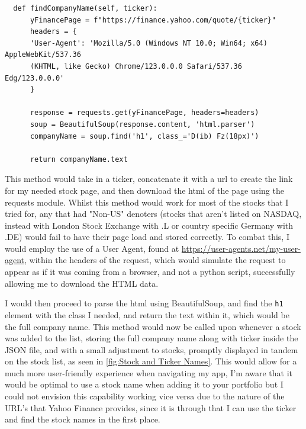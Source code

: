 \documentclass{article}
\begin{document}
\begin{verbatim}
  def findCompanyName(self, ticker):
      yFinancePage = f"https://finance.yahoo.com/quote/{ticker}"
      headers = {
      'User-Agent': 'Mozilla/5.0 (Windows NT 10.0; Win64; x64) AppleWebKit/537.36 
      (KHTML, like Gecko) Chrome/123.0.0.0 Safari/537.36 Edg/123.0.0.0'
      } 

      response = requests.get(yFinancePage, headers=headers)
      soup = BeautifulSoup(response.content, 'html.parser')
      companyName = soup.find('h1', class_='D(ib) Fz(18px)')

      return companyName.text
\end{verbatim}

\vspace{0.3cm}
This method would take in a ticker, concatenate it with a url to create the link for my needed stock page, and then download the html of the page using the requests module. Whilst this method would work for most of the stocks that I tried for, any that had "Non-US" denoters (stocks that aren't listed on NASDAQ, instead with London Stock Exchange with .L or country specific Germany with .DE) would fail to have their page load and stored correctly. To combat this, I would employ the use of a User Agent, found at \url{https://user-agents.net/my-user-agent}, within the headers of the request, which would simulate the request to appear as if it was coming from a browser, and not a python script, successfully allowing me to download the HTML data.\\\vspace{0.3cm}

I would then proceed to parse the html using BeautifulSoup, and find the \texttt{h1} element with the class I needed, and return the text within it, which would be the full company name. This method would now be called upon whenever a stock was added to the list, storing the full company name along with ticker inside the JSON file, and with a small adjustment to stocks, promptly displayed in tandem on the stock list, as seen in \ref{fig:Stock and Ticker Names}. This would allow for a much more user-friendly experience when navigating my app, I'm aware that it would be optimal to use a stock name when adding it to your portfolio but I could not envision this capability working vice versa due to the nature of the URL's that Yahoo Finance provides, since it is through that I can use the ticker and find the stock names in the first place.\\\vspace{0.3cm} 
\end{document}
